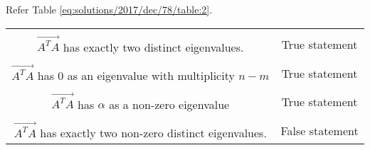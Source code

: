 \begin{table*}[ht!]
\caption{Explanation}
\label{eq:solutions/2017/dec/78/table:1}
\end{table*}

Refer Table \ref{eq:solutions/2017/dec/78/table:2}.

\begin{table*}[ht]
\begin{center}
\resizebox{\columnwidth}{!}
{
\begin{tabular}{|c|c|}
\hline
& \\
$\vec{A^TA}$ has exactly two distinct eigenvalues.
& True statement\\
\hline
& \\
$\vec{A^TA}$ has 0 as an eigenvalue with multiplicity $n-m$
& True statement\\
\hline
& \\
$\vec{A^TA}$ has $\alpha$ as a non-zero eigenvalue
&  True statement\\
\hline
& \\
$\vec{A^TA}$ has exactly two non-zero distinct eigenvalues.
& False statement\\
\hline
\end{tabular}
}
\end{center}
\caption{Solution}
\label{eq:solutions/2017/dec/78/table:2}
\end{table*}
